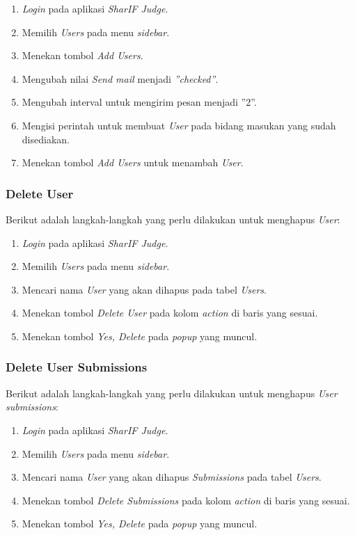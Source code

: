 \begin{enumerate}
	\item \textit{Login} pada aplikasi \textit{SharIF Judge}.
	\item Memilih \textit{Users} pada menu \textit{sidebar}.
	\item Menekan tombol \textit{Add Users}.
	\item Mengubah nilai \textit{Send mail} menjadi \textit{''checked''}.
	\item Mengubah interval untuk mengirim pesan menjadi ''2''.
	\item Mengisi perintah untuk membuat \textit{User} pada bidang masukan yang sudah disediakan.
	\item Menekan tombol \textit{Add Users} untuk menambah \textit{User}.
\end{enumerate}

\subsubsection{Delete User}
\label{subsubsec:skenario_delete_user}
Berikut adalah langkah-langkah yang perlu dilakukan untuk menghapus \textit{User}:

\begin{enumerate}
	\item \textit{Login} pada aplikasi \textit{SharIF Judge}.
	\item Memilih \textit{Users} pada menu \textit{sidebar}.
	\item Mencari nama \textit{User} yang akan dihapus pada tabel \textit{Users}.
	\item Menekan tombol \textit{Delete User} pada kolom \textit{action} di baris yang sesuai.
	\item Menekan tombol \textit{Yes, Delete} pada \textit{popup} yang muncul.
\end{enumerate}

\subsubsection{Delete User Submissions}
\label{subsubsec:skenario_delete_user_submissions}
Berikut adalah langkah-langkah yang perlu dilakukan untuk menghapus \textit{User submissions}:

\begin{enumerate}
	\item \textit{Login} pada aplikasi \textit{SharIF Judge}.
	\item Memilih \textit{Users} pada menu \textit{sidebar}.
	\item Mencari nama \textit{User} yang akan dihapus \textit{Submissions} pada tabel \textit{Users}.
	\item Menekan tombol \textit{Delete Submissions} pada kolom \textit{action} di baris yang sesuai.
	\item Menekan tombol \textit{Yes, Delete} pada \textit{popup} yang muncul.
\end{enumerate}

